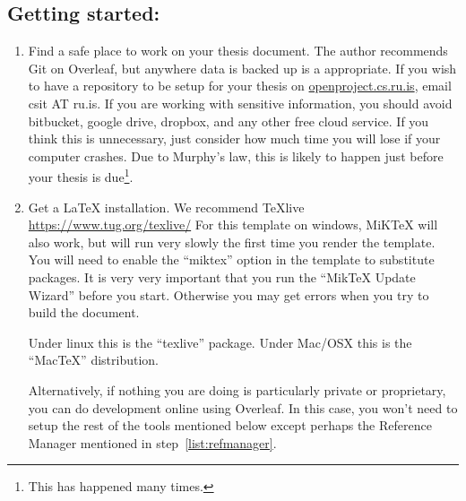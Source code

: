 \subsection{Getting started:}
\begin{enumerate}
\item Find a safe place to work on your thesis document.
  The author recommends Git on Overleaf, but anywhere data is backed up is a appropriate.
  If you wish to have a repository to be setup for your thesis on \url{openproject.cs.ru.is}, email csit AT ru.is.  
  If you are working with sensitive information, you should avoid bitbucket, google drive, dropbox, and any other free cloud service.
  If you think this is unnecessary, just consider how much time you will lose if your computer crashes.
   Due to Murphy's law, this is likely to happen just before your thesis is due\footnote{This has happened many times.}.

 \item Get a LaTeX installation.  We recommend TeXlive \url{https://www.tug.org/texlive/}
   For this template on windows, MiKTeX will also work, but will run very slowly the first time you render the template.
   You will need to enable the ``miktex'' option in the template to substitute packages.
   It is very very important that you run the ``MikTeX Update Wizard'' before you start.
   Otherwise you may get errors when you try to build the document.

   Under linux this is the ``texlive'' package.
   Under Mac/OSX this is the ``MacTeX'' distribution.

   Alternatively, if nothing you are doing is particularly private or proprietary, you can do development online using Overleaf.
   In this case, you won't need to setup the rest of the tools mentioned below except perhaps the Reference Manager mentioned in step~\ref{list:refmanager}.
   


\end{enumerate}
